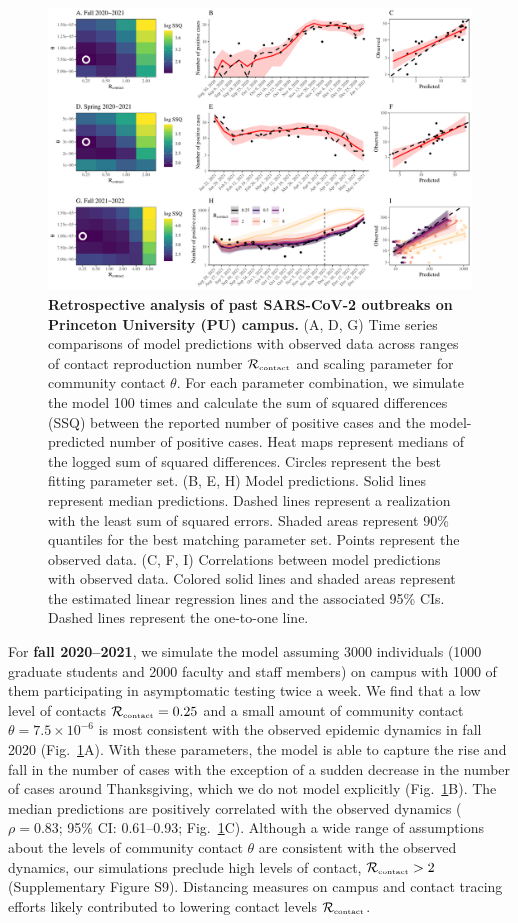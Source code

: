 \documentclass[12pt]{article}
\newcommand{\fref}[1]{Fig.~\ref{fig:#1}}
\newcommand{\Rx}[1]{\ensuremath{{\mathcal R}_{#1}}}
\newcommand{\Rc}{\Rx{\textrm{\tiny{contact}}}}
\begin{document}
\begin{figure}[!th]
\includegraphics[width=\textwidth]{../figure_princeton_new/figure_princeton_simulation.pdf}
\caption{
\textbf{Retrospective analysis of past SARS-CoV-2 outbreaks on Princeton University (PU) campus.}
(A, D, G) Time series comparisons of model predictions with observed data across ranges of contact reproduction number $\Rc$ and scaling parameter for community contact $\theta$.
For each parameter combination, we simulate the model 100 times and calculate the sum of squared differences (SSQ) between the reported number of positive cases and the model-predicted number of positive cases. 
Heat maps represent medians of the logged sum of squared differences.
Circles represent the best fitting parameter set.
(B, E, H) Model predictions. 
Solid lines represent median predictions.
Dashed lines represent a realization with the least sum of squared errors.
Shaded areas represent 90\% quantiles for the best matching parameter set.
Points represent the observed data.
(C, F, I) Correlations between model predictions with observed data.
Colored solid lines and shaded areas represent the estimated linear regression lines and the associated 95\% CIs.
Dashed lines represent the one-to-one line.
\label{fig:matching}
}
\end{figure}

For \textbf{fall 2020--2021}, we simulate the model assuming 3000 individuals (1000 graduate students and 2000 faculty and staff members) on campus with 1000 of them participating in asymptomatic testing twice a week.
We find that a low level of contacts $\Rc=0.25$ and a small amount of community contact $\theta=7.5\times 10^{-6}$ is most consistent with the observed epidemic dynamics in fall 2020 (\fref{matching}A).
With these parameters, the model is able to capture the rise and fall in the number of cases with the exception of a sudden decrease in the number of cases around Thanksgiving, which we do not model explicitly (\fref{matching}B).
The median predictions are positively correlated with the observed dynamics ($\rho = 0.83$; 95\% CI: 0.61--0.93; \fref{matching}C).
Although a wide range of assumptions about the levels of community contact $\theta$ are consistent with the observed dynamics, our simulations preclude high levels of contact, $\Rc > 2$ (Supplementary Figure S9).
Distancing measures on campus and contact tracing efforts likely contributed to lowering contact levels $\Rc$.
\end{document}
